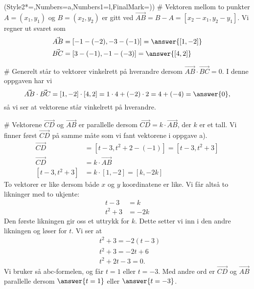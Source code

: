 \begin{easylist}[enumerate]
	\ListProperties(Style2*=,Numbers=a,Numbers1=l,FinalMark={)})
	# Vektoren mellom to punkter $A = (x_1, y_1)$ og $B = (x_2, y_2)$ er gitt ved $\vec{AB} = B -A = [x_2 - x_1, y_2 - y_1]$. 
	Vi regner ut svaret som
	\begin{align*}
		\vec{AB} &= [-1-(-2), -3-(-1)] = \answer{[1,-2]} \\
		\vec{BC} &= [3-(-1),-1-(-3)] = \answer{[4,2]}
	\end{align*}
	
	# Generelt står to vektorer vinkelrett på hverandre dersom $\vec{AB} \cdot \vec{BC} = 0$.
	I denne oppgaven har vi
	\begin{equation*}
		\vec{AB} \cdot \vec{BC} = [1,-2] \cdot [4,2] = 1 \cdot 4 + (-2) \cdot 2 = 4 + (-4) = \answer{0},
	\end{equation*} 
	så vi ser at vektorene står vinkelrett på hverandre.
	
	# Vektorene $\vec{CD}$ og $\vec{AB}$ er parallelle dersom $\vec{CD} = k \cdot \vec{AB}$, der $k$ er et tall. 
	Vi finner først $\vec{CD}$ på samme måte som vi fant vektorene i oppgave a). 
	\begin{align*}
		\vec{CD} &= [t-3,t^2 + 2- (-1)] = [t-3,t^2 + 3] \\
		\vec{CD} & = k \cdot \vec{AB}\\
		[t-3,t^2 + 3] & = k \cdot [1,-2]  = [k,-2k]
	\end{align*}
	To vektorer er like dersom både $x$ og $y$ koordinatene er like.
	Vi får altså to likninger med to ukjente: 
	\begin{align*}
		t-3 &= k \\
		 t^2 + 3 &= -2k 
	\end{align*}
	Den første likningen gir oss et uttrykk for $k$.
	Dette setter vi inn i den andre likningen og løser for $t$.
	Vi ser at
	\begin{align*}
			&t^2 + 3  = -2(t-3)\\
			&t^2 + 3  = -2t + 6\\
			&t^2 +2t -3 = 0.
	\end{align*}
	Vi bruker så abc-formelen, og får $t = 1$ eller $t=-3$.
	Med andre ord er $\vec{CD}$ og $\vec{AB}$ parallelle dersom $\answer{t = 1}$ eller  $\answer{t = -3}$.
\end{easylist}

